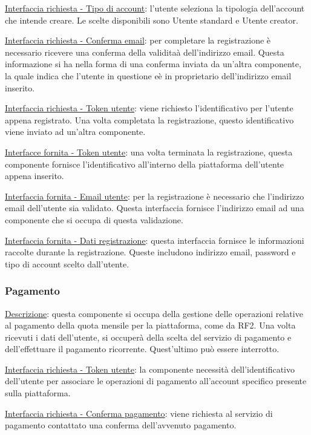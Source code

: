 \documentclass[a4paper,12pt]{article}
\begin{document}
\underline{Interfaccia richiesta - Tipo di account}: l’utente seleziona la tipologia dell’account che intende creare. Le scelte disponibili sono Utente standard e Utente creator.

\underline{Interfaccia richiesta - Conferma email}: per completare la registrazione è necessario ricevere una conferma della validitaà dell'indirizzo email. Questa informazione si ha nella forma di una conferma inviata da un'altra componente, la quale indica che l’utente in questione eè in proprietario dell'indirizzo email inserito.

\underline{Interfaccia richiesta - Token utente}: viene richiesto l’identificativo per l’utente appena registrato. Una volta completata la registrazione, questo identificativo viene inviato ad un’altra componente.

\underline{Interfacce fornita - Token utente}: una volta terminata la registrazione, questa componente fornisce l’identificativo all’interno della piattaforma dell’utente appena inserito.

\underline{Interfaccia fornita - Email utente}: per la registrazione è necessario che l’indirizzo email dell’utente sia validato. Questa interfaccia fornisce l’indirizzo email ad una componente che si occupa di questa validazione.

\underline{Interfaccia fornita - Dati registrazione}: questa interfaccia fornisce le informazioni raccolte durante la registrazione. Queste includono indirizzo email, password e tipo di account scelto dall’utente.

\subsubsection{Pagamento}

\underline{Descrizione}: questa componente si occupa della gestione delle operazioni relative al pagamento della quota mensile per la piattaforma, come da RF2. Una volta ricevuti i dati dell’utente, si occuperà della scelta del servizio di pagamento e dell’effettuare il pagamento ricorrente. Quest’ultimo può essere interrotto.

\underline{Interfaccia richiesta - Token utente}: la componente necessità dell’identificativo dell’utente per associare le operazioni di pagamento all’account specifico presente sulla piattaforma. 

\underline{Interfaccia richiesta - Conferma pagamento}: viene richiesta al servizio di pagamento contattato una conferma dell’avvenuto pagamento.
\end{document}
